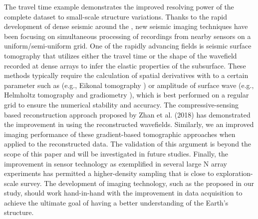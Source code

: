 The travel time example demonstrates the improved resolving power of the complete dataset to small-scale structure variations.  Thanks to the rapid development of dense seismic  around the , new seismic imaging techniques have been focusing on simultaneous processing of recordings from nearby sensors on a uniform/semi-uniform grid. One of the rapidly advancing fields is seismic surface tomography that utilizes either the travel time \cite[]{lin2009eikonal, jin2015surface} or the shape of the wavefield \cite[]{lin2011helmholtz, langston2007wave} recorded at dense arrays to infer the elastic properties of the subsurface. These methods typically require the calculation of spatial derivatives with  to a certain parameter such as  (e.g., Eikonal tomography \cite[]{lin2009eikonal}) or amplitude of  surface wave (e.g., Helmholtz tomography \cite[]{lin2011helmholtz} and gradiometry \cite[]{langston2007wave}), which is best performed on a regular grid to ensure the numerical stability and accuracy.  The compressive-sensing based reconstruction approach proposed by Zhan et al. (2018) \cite[]{zhan2018application} has demonstrated the improvement in  using the reconstructed wavefields.  Similarly, we  an improved imaging performance of these gradient-based tomographic approaches when applied to the reconstructed data.  The validation of this argument is beyond the scope of this paper and will be investigated in future studies. Finally, the improvement in sensor technology as exemplified in several large N array experiments \cite[]{lin2013high,schmandt2013analysis,hansen2015automated,ward2018high} has permitted a higher-density sampling that is close to  exploration-scale survey. The development of imaging technology, such as the  proposed in our study, should work hand-in-hand with the improvement in data acquisition to achieve the ultimate goal of having a better understanding of the Earth's structure.


